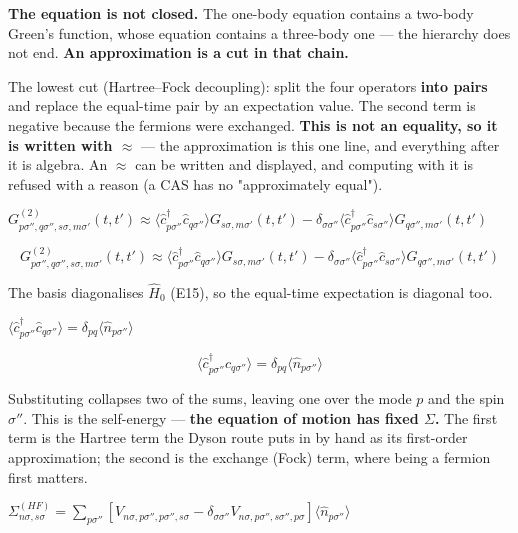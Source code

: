\documentclass[dvipdfmx]{article}
\begin{document}
\textbf{The equation is not closed.} The one-body equation contains a two-body Green's function, whose equation contains a three-body one — the hierarchy does not end. \textbf{An approximation is a cut in that chain.}

The lowest cut (Hartree–Fock decoupling): split the four operators \textbf{into pairs} and replace the equal-time pair by an expectation value. The second term is negative because the fermions were exchanged. \textbf{This is not an equality, so it is written with $\approx$} — the approximation is this one line, and everything after it is algebra. An $\approx$ can be written and displayed, and computing with it is refused with a reason (a CAS has no "approximately equal").

$G^{(2)}_{p\sigma'',q\sigma'',s\sigma,m\sigma'}(t,t') \approx \langle \hat c^\dagger_{p\sigma''} \hat c_{q\sigma''}\rangle G_{s\sigma,m\sigma'}(t,t') - \delta_{\sigma\sigma''} \langle \hat c^\dagger_{p\sigma''} \hat c_{s\sigma''}\rangle G_{q\sigma'',m\sigma'}(t,t')$

\begin{equation}
  G^{(2)}_{p\sigma'',q\sigma'',s\sigma,m\sigma'}(t,t') \approx \langle \hat c^\dagger_{p\sigma''} \hat c_{q\sigma''}\rangle G_{s\sigma,m\sigma'}(t,t') - \delta_{\sigma\sigma''} \langle \hat c^\dagger_{p\sigma''} \hat c_{s\sigma''}\rangle G_{q\sigma'',m\sigma'}(t,t')
  \label{eq:E26}
\end{equation}

The basis diagonalises $\hat H_0$ (E15), so the equal-time expectation is diagonal too.

$\langle \hat c^\dagger_{p\sigma''} \hat c_{q\sigma''}\rangle = \delta_{pq}\langle \hat n_{p\sigma''}\rangle$

\begin{equation}
  \langle \hat c^\dagger_{p\sigma''} \hat c_{q\sigma''}\rangle = \delta_{pq}\langle \hat n_{p\sigma''}\rangle
  \label{eq:E27}
\end{equation}

Substituting collapses two of the sums, leaving one over the mode $p$ and the spin $\sigma''$. This is the self-energy — \textbf{the equation of motion has fixed $\Sigma$.} The first term is the Hartree term the Dyson route puts in by hand as its first-order approximation; the second is the exchange (Fock) term, where being a fermion first matters.

$\Sigma^{(HF)}_{n\sigma,s\sigma} = \sum_{p \sigma''}\left[V_{n\sigma,p\sigma'',p\sigma'',s\sigma} - \delta_{\sigma\sigma''}V_{n\sigma,p\sigma'',s\sigma'',p\sigma}\right]\langle \hat n_{p\sigma''} \rangle$
\end{document}
